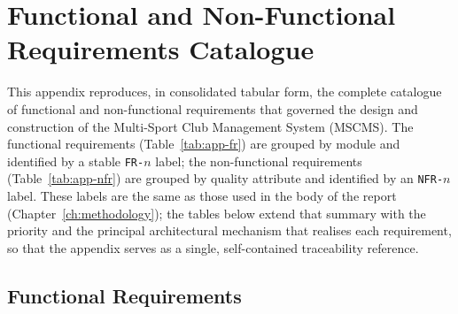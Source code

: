 \appendix

\chapter{Functional and Non-Functional Requirements Catalogue}
\label{app:requirements}

This appendix reproduces, in consolidated tabular form, the complete catalogue of
functional and non-functional requirements that governed the design and construction of the
Multi-Sport Club Management System (MSCMS). The functional requirements (Table~\ref{tab:app-fr})
are grouped by module and identified by a stable \texttt{FR-$n$} label; the non-functional
requirements (Table~\ref{tab:app-nfr}) are grouped by quality attribute and identified by an
\texttt{NFR-$n$} label. These labels are the same as those used in the body of the report
(Chapter~\ref{ch:methodology}); the tables below extend that summary with the priority and
the principal architectural mechanism that realises each requirement, so that the appendix
serves as a single, self-contained traceability reference.

\section{Functional Requirements}
\label{app:fr}

